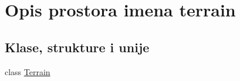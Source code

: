 \hypertarget{namespaceterrain}{}\section{Opis prostora imena terrain}
\label{namespaceterrain}
\subsection*{Klase, strukture i unije}
\begin{DoxyCompactItemize}
\item 
class \hyperlink{classterrain_1_1Terrain}{Terrain}
\end{DoxyCompactItemize}

